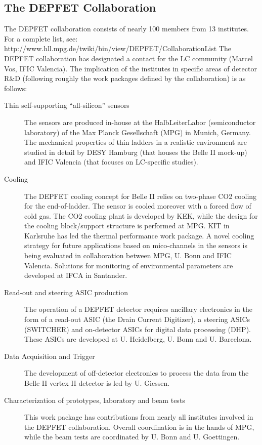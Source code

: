 \subsection{The DEPFET Collaboration}
The DEPFET collaboration consists of nearly 100 members from 13 institutes. For a complete list, see:
http://www.hll.mpg.de/twiki/bin/view/DEPFET/CollaborationList
The DEPFET collaboration has designated a contact for the LC community (Marcel Vos, IFIC Valencia).
The implication of the institutes in specific areas of detector R\&D (following roughly the work packages defined by the collaboration) is as follows:
\begin{description}
\item[Thin self-supporting ``all-silicon'' sensors] {The sensors are produced in-house at the HalbLeiterLabor (semiconductor laboratory) of the Max Planck Gesellschaft (MPG) in Munich, Germany.
The mechanical properties of thin ladders in a realistic environment are studied in detail by DESY Hamburg (that houses the Belle II mock-up) and IFIC Valencia (that focuses on LC-specific studies).
}
\item[Cooling] {The DEPFET cooling concept for Belle II relies on two-phase CO2 cooling for the end-of-ladder. The sensor is cooled moreover with a forced flow of cold gas. The CO2 cooling plant is developed by KEK, while the design for the cooling block/support structure is performed at MPG. KIT in Karlsruhe has led the thermal performance work package.
A novel cooling strategy for future applications based on mico-channels in the sensors is being evaluated in collaboration between MPG, U. Bonn and IFIC Valencia. Solutions for monitoring of environmental parameters are developed at IFCA in Santander.}
\item[Read-out and steering ASIC production] {The operation of a DEPFET detector requires ancillary electronics in the form of a read-out ASIC (the Drain Current Digitizer), a steering ASICs (SWITCHER) and on-detector ASICs for digital data processing (DHP). These ASICs are developed at U. Heidelberg, U. Bonn and U. Barcelona.}
\item[Data Acquisition and Trigger] {The development of off-detector electronics to process the data from the Belle II vertex II detector is led by U. Giessen.}
\item[Characterization of prototypes, laboratory and beam tests] {This work package has contributions from nearly all institutes involved in the DEPFET collaboration. Overall coordination is in the hands of MPG, while the beam tests are coordinated by U. Bonn and U. Goettingen.}
\end{description}